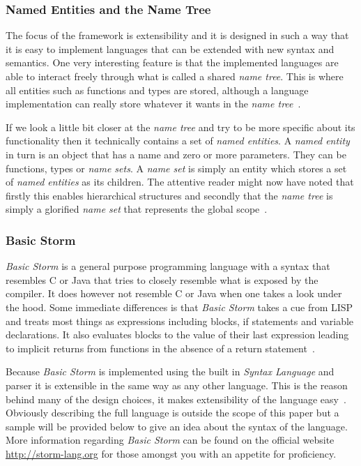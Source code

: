 \documentclass{sigchi}
\begin{document}
\subsubsection{Named Entities and the Name Tree}
The focus of the framework is extensibility and it is designed in such a way that it is easy to implement languages that can be extended with new syntax and semantics. One very interesting feature is that the implemented languages are able to interact freely through what is called a shared \emph{name tree}. This is where all entities such as functions and types are stored, although a language implementation can really store whatever it wants in the \emph{name tree}~\cite{Storm:2023}.

If we look a little bit closer at the \emph{name tree} and try to be more specific about its functionality then it technically contains a set of \emph{named entities}. A \emph{named entity} in turn is an object that has a name and zero or more parameters. They can be functions, types or \emph{name sets}. A \emph{name set} is simply an entity which stores a set of \emph{named entities} as its children. The attentive reader might now have noted that firstly this enables hierarchical structures and secondly that the \emph{name tree} is simply a glorified \emph{name set} that represents the global scope~\cite{Storm:2023}.

\subsubsection{Basic Storm}
\emph{Basic Storm} is a general purpose programming language with a syntax that resembles C or Java that tries to closely resemble what is exposed by the compiler. It does however not resemble C or Java when one takes a look under the hood. Some immediate differences is that \emph{Basic Storm} takes a cue from LISP and treats most things as expressions including blocks, if statements and variable declarations. It also evaluates blocks to the value of their last expression leading to implicit returns from functions in the absence of a return statement~\cite{Storm:2023}.

Because \emph{Basic Storm} is implemented using the built in \emph{Syntax Language} and parser it is extensible in the same way as any other language. This is the reason behind many of the design choices, it makes extensibility of the language easy~\cite{Storm:2023}. Obviously describing the full language is outside the scope of this paper but a sample will be provided below to give an idea about the syntax of the language. More information regarding \emph{Basic Storm} can be found on the official website \url{http://storm-lang.org} for those amongst you with an appetite for proficiency.
\end{document}
